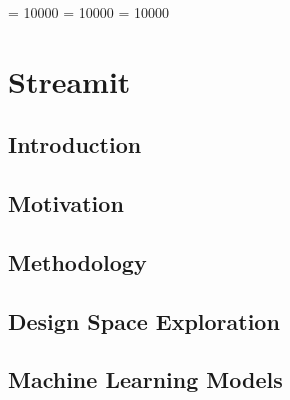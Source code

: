 %
%
%
%
%
%
%

\newcommand{\ie}{i.\,e.\xspace}
\newcommand{\eg}{e.\,g.\xspace}
\newcommand{\bench}[1]{\textit{#1}\xspace}
\clubpenalty = 10000
\widowpenalty = 10000
\displaywidowpenalty = 10000
\chapter{Streamit}

\section{Introduction}
\label{sec:intro}


%

\section{Motivation}
\label{sec:motiviation}


\section{Methodology}
\label{sec:setup}


\section{Design Space Exploration}
\label{sec:dse}


\section{Machine Learning Models}
\label{sec:ml}



